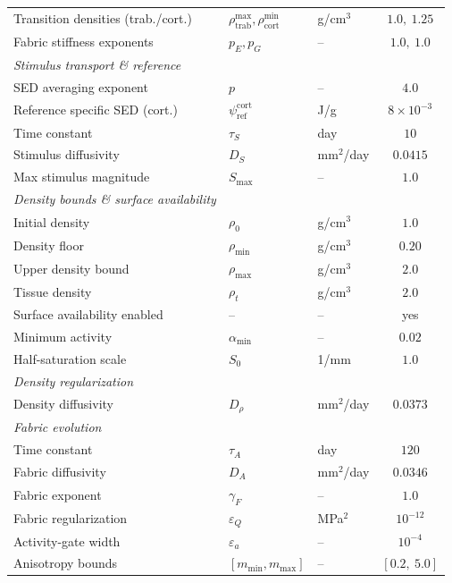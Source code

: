 \begin{table}[!htbp]
\begin{tabularx}{\textwidth}{@{} >{\raggedright\arraybackslash}X l l r r @{}}
    Transition densities (trab./cort.) & $\rho_{\mathrm{trab}}^{\max}, \rho_{\mathrm{cort}}^{\min}$ & g/cm$^3$ & \multicolumn{2}{c}{$1.0, \ 1.25$} \\
    Fabric stiffness exponents & $p_E, p_G$ & -- & \multicolumn{2}{c}{$1.0, \ 1.0$} \\
    \addlinespace
    \textit{Stimulus transport \& reference} & & & & \\
    SED averaging exponent & $p$ & -- & \multicolumn{2}{c}{$4.0$} \\
    Reference specific SED (cort.) & $\psi_{\mathrm{ref}}^{\mathrm{cort}}$ & J/g & \multicolumn{2}{c}{$8\times 10^{-3}$} \\
    Time constant & $\tau_S$ & day & \multicolumn{2}{c}{$10$} \\
    Stimulus diffusivity & $D_S$ & mm$^2$/day & \multicolumn{2}{c}{$0.0415$} \\
    Max stimulus magnitude & $S_{\max}$ & -- & \multicolumn{2}{c}{$1.0$} \\
    \addlinespace
    \textit{Density bounds \& surface availability} & & & & \\
    Initial density & $\rho_0$ & g/cm$^3$ & \multicolumn{2}{c}{$1.0$} \\
    Density floor & $\rho_{\min}$ & g/cm$^3$ & \multicolumn{2}{c}{$0.20$} \\
    Upper density bound & $\rho_{\max}$ & g/cm$^3$ & \multicolumn{2}{c}{$2.0$} \\
    Tissue density & $\rho_{t}$ & g/cm$^3$ & \multicolumn{2}{c}{$2.0$} \\
    Surface availability enabled & -- & -- & \multicolumn{2}{c}{yes} \\
    Minimum activity & $\alpha_{\min}$ & -- & \multicolumn{2}{c}{$0.02$} \\
    Half-saturation scale & $S_0$ & 1/mm & \multicolumn{2}{c}{$1.0$} \\
    \addlinespace
    \textit{Density regularization} & & & & \\
    Density diffusivity & $D_\rho$ & mm$^2$/day & \multicolumn{2}{c}{$0.0373$} \\
    \addlinespace
    \textit{Fabric evolution} & & & & \\
    Time constant & $\tau_A$ & day & \multicolumn{2}{c}{$120$} \\
    Fabric diffusivity & $D_A$ & mm$^2$/day & \multicolumn{2}{c}{$0.0346$} \\
    Fabric exponent & $\gamma_F$ & -- & \multicolumn{2}{c}{$1.0$} \\
    Fabric regularization & $\varepsilon_Q$ & MPa$^2$ & \multicolumn{2}{c}{$10^{-12}$} \\
    Activity-gate width & $\varepsilon_a$ & -- & \multicolumn{2}{c}{$10^{-4}$} \\
    Anisotropy bounds & $[m_{\min}, m_{\max}]$ & -- & \multicolumn{2}{c}{$[0.2, \ 5.0]$} \\
    \bottomrule
  \end{tabularx}
\end{table}
